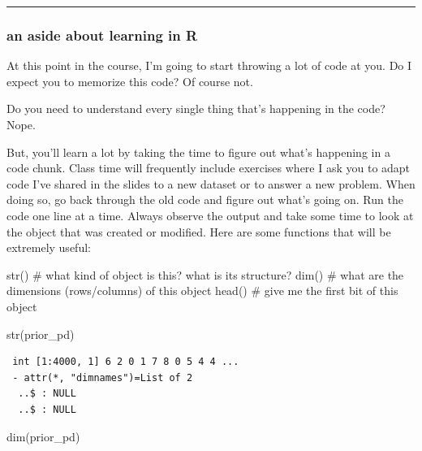 \documentclass[
  letterpaper,
  DIV=11,
  numbers=noendperiod]{scrartcl}
\newenvironment{Shaded}{\begin{snugshade}}{\end{snugshade}}
\newcommand{\CommentTok}[1]{\textcolor[rgb]{0.37,0.37,0.37}{#1}}
\newcommand{\FunctionTok}[1]{\textcolor[rgb]{0.28,0.35,0.67}{#1}}
\newcommand{\NormalTok}[1]{\textcolor[rgb]{0.00,0.23,0.31}{#1}}
\begin{document}
\begin{center}\rule{0.5\linewidth}{0.5pt}\end{center}

\subsubsection{an aside about learning in
R}\label{an-aside-about-learning-in-r}

At this point in the course, I'm going to start throwing a lot of code
at you. Do I expect you to memorize this code? Of course not.

Do you need to understand every single thing that's happening in the
code? Nope.

But, you'll learn a lot by taking the time to figure out what's
happening in a code chunk. Class time will frequently include exercises
where I ask you to adapt code I've shared in the slides to a new dataset
or to answer a new problem. When doing so, go back through the old code
and figure out what's going on. Run the code one line at a time. Always
observe the output and take some time to look at the object that was
created or modified. Here are some functions that will be extremely
useful:

\begin{Shaded}
\begin{Highlighting}[]
\FunctionTok{str}\NormalTok{() }\CommentTok{\# what kind of object is this? what is its structure?}
\FunctionTok{dim}\NormalTok{() }\CommentTok{\# what are the dimensions (rows/columns) of this object}
\FunctionTok{head}\NormalTok{() }\CommentTok{\# give me the first bit of this object}
\end{Highlighting}
\end{Shaded}

\begin{Shaded}
\begin{Highlighting}[]
\FunctionTok{str}\NormalTok{(prior\_pd)}
\end{Highlighting}
\end{Shaded}

\begin{verbatim}
 int [1:4000, 1] 6 2 0 1 7 8 0 5 4 4 ...
 - attr(*, "dimnames")=List of 2
  ..$ : NULL
  ..$ : NULL
\end{verbatim}

\begin{Shaded}
\begin{Highlighting}[]
\FunctionTok{dim}\NormalTok{(prior\_pd)}
\end{Highlighting}
\end{Shaded}
\end{document}
